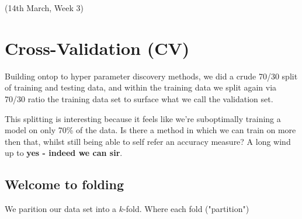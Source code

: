 \documentclass{article}
\begin{document}
(14th March, Week 3)
\section*{Cross-Validation (CV)}
Building ontop to hyper parameter discovery methods, we did a crude 70/30 split of training and testing data, and within the training data we split again via 70/30 ratio the training data set to surface what we call the validation set.

This splitting is interesting because it feels like we're suboptimally training a model on only 70\% of the data. Is there a method in which we can train on more then that, whilst still being able to self refer an accuracy measure? A long wind up to {\bf yes - indeed we can sir}.

\subsection*{Welcome to folding}
We parition our data set into a $k$-fold. Where each fold ("partition")
\end{document}
